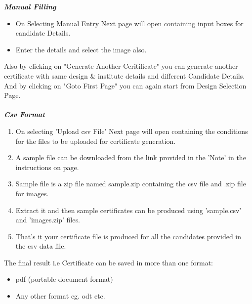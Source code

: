 \begin{Large}
\end{Large}
\textbf{\emph{Manual Filling}}
\begin{itemize}
\item On Selecting Manual Entry Next page will open containing input boxes for candidate Details.
\item Enter the details and select the image also.
\end{itemize}
Also by clicking on "Generate Another Ceritificate" you can generate another certificate with same design \& institute details and different Candidate Details.
And by clicking on "Goto First Page" you can again start from Design Selection Page.\\\\
\textbf{\emph{Csv Format}}
\begin{enumerate}
\item On selecting 'Upload csv File' Next page will open containing the conditions for the files to be uploaded for certificate generation.
\item A sample file can be downloaded from the link provided in the 'Note' in the instructions on page.
\item Sample file is a zip file named sample.zip containing the csv file and .zip file for images.
\item Extract it and then sample certificates can be produced using 'sample.csv' and 'images.zip' files.
\item That's it your certificate file is produced for all the candidates provided in the csv data file.
\end{enumerate}  
\begin{Large}
\end{Large}    
The final result i.e Certificate can be saved in more than one format:
\begin{itemize}
\item pdf (portable document format)
\item Any other format eg. odt etc.
\end{itemize}


